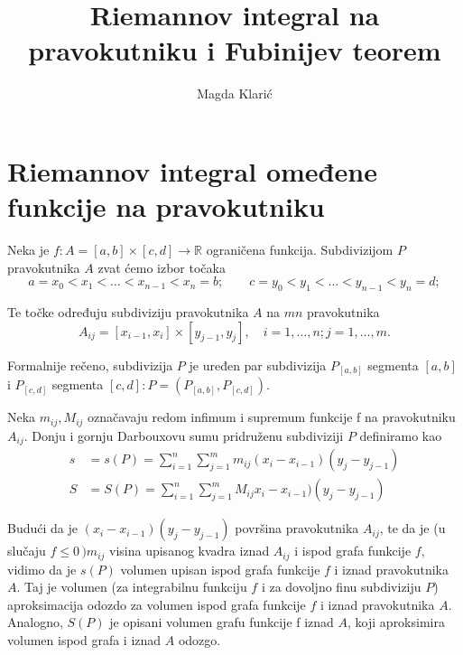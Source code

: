 \documentclass[a4paper, 11pt]{article}
\title{Riemannov integral na pravokutniku i Fubinijev teorem}
\author{Magda Klari\'c}
\theoremstyle{plain}
\theoremstyle{plain}
\theoremstyle{definition}
\theoremstyle{remark}
\begin{document}
\maketitle


\newpage
\tableofcontents{}
\newpage

\section{Riemannov integral omeđene funkcije na pravokutniku}

Neka je $f:A=[a,b] \times [c,d] \to \mathbb{R} $ ograničena funkcija. Subdivizijom $P$ pravokutnika $A$ zvat ćemo izbor točaka 
$$
    a=x_0 < x_1 < \ldots < x_{n-1} < x_n =b; \quad \quad c=y_0 < y_1 < \ldots < y_{n-1} < y_n =d;
$$

\noindent Te točke određuju subdiviziju pravokutnika $A$ na $mn$ pravokutnika
$$
    A_{ij} = [x_{i-1}, x_i] \times [y_{j-1}, y_j], \quad i=1,\ldots, n;j=1,\ldots, m.
$$

Formalnije rečeno, subdivizija $P$ je uređen par subdivizija $P_{[a,b]}$ segmenta $[a,b]$ i $P_{[c,d]}$ 
segmenta $[c,d]: P=(P_{[a,b]},P_{[c,d]})$. 

Neka $m_{ij}, M_{ij}$ označavaju redom infimum i supremum funkcije f na pravokutniku $A_{ij}$. Donju i gornju Darbouxovu sumu pridruženu subdiviziji $P$ definiramo kao
\begin{align*}
    s&=s(P)=\sum_{i=1}^n \sum_{j=1}^m m_{ij}(x_i-x_{i-1})(y_j - y_{j-1}) \\
    S&=S(P)=\sum_{i=1}^n \sum_{j=1}^m M_{ij}x_i-x_{i-1})(y_j - y_{j-1})
\end{align*}

Budući da je $(x_i-x_{i-1})(y_j - y_{j-1})$ površina pravokutnika $A_{ij}$, te da je (u slučaju $f \leq 0\,) m_{ij}$ visina
upisanog kvadra iznad $A_{ij}$ i ispod grafa funkcije $f$, vidimo da je $s(P)$ volumen upisan
ispod grafa funkcije $f$ i iznad pravokutnika $A$. Taj je volumen (za integrabilnu funkciju $f$ i za
dovoljno finu subdiviziju $P$) aproksimacija odozdo za volumen ispod grafa funkcije $f$ i iznad
pravokutnika $A$. Analogno, $S(P)$ je opisani volumen grafu funkcije f iznad $A$, koji aproksimira
volumen ispod grafa i iznad $A$ odozgo.
\end{document}
